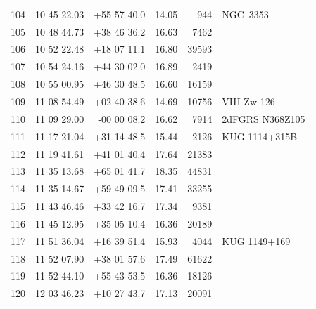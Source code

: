 \documentclass[useAMS,usenatbib]{mn2e}
\begin{document}
\begin{table}
\begin{tabular}{rrrlrl}
 104 &  10 45 22.03 & +55 57 40.0 &  14.05 &    944 &        NGC~3353  \\
 105 &  10 48 44.73 & +38 46 36.2 &  16.63 &   7462 &                  \\
 106 &  10 52 22.48 & +18 07 11.1 &  16.80 &  39593 &                  \\
 107 &  10 54 24.16 & +44 30 02.0 &  16.89 &   2419 &                  \\
 108 &  10 55 00.95 & +46 30 48.5 &  16.60 &  16159 &                  \\
 109 &  11 08 54.49 & +02 40 38.6 &  14.69 &  10756 &     VIII Zw 126  \\
 110 &  11 09 29.00 & -00 00 08.2 &  16.62 &   7914 & 2dFGRS N368Z105  \\
 111 &  11 17 21.04 & +31 14 48.5 &  15.44 &   2126 &   KUG 1114+315B  \\
 112 &  11 19 41.61 & +41 01 40.4 &  17.64 &  21383 &                  \\
 113 &  11 35 13.68 & +65 01 41.7 &  18.35 &  44831 &                  \\
 114 &  11 35 14.67 & +59 49 09.5 &  17.41 &  33255 &                  \\
 115 &  11 43 46.46 & +33 42 16.7 &  17.34 &   9381 &                  \\
 116 &  11 45 12.95 & +35 05 10.4 &  16.36 &  20189 &                  \\
 117 &  11 51 36.04 & +16 39 51.4 &  15.93 &   4044 &    KUG 1149+169  \\
 118 &  11 52 07.90 & +38 01 57.6 &  17.49 &  61622 &                  \\
 119 &  11 52 44.10 & +55 43 53.5 &  16.36 &  18126 &                  \\
 120 &  12 03 46.23 & +10 27 43.7 &  17.13 &  20091 &                  \\
 \hline
\end{tabular}
\end{table}
\end{document}
